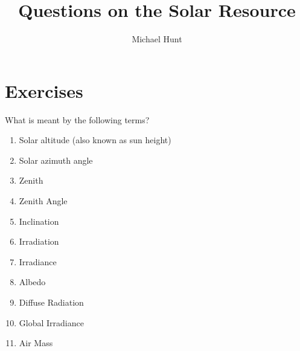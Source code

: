\documentclass{article} %
\title{Questions on the Solar Resource}
\author{Michael Hunt}
\date{}
\begin{document}
\maketitle

\section*{Exercises}
\begin{question}\label{qu:ex1}
What is meant by the following terms?
    \begin{enumerate}[label=\alph*)]
        \item Solar altitude (also known as sun height)
        \item Solar azimuth angle
        \item Zenith
        \item Zenith Angle
        \item Inclination
        \item Irradiation
        \item Irradiance
        \item Albedo 
        \item Diffuse Radiation
        \item Global Irradiance
        \item Air Mass
    \end{enumerate}
\end{question}
\end{document}
